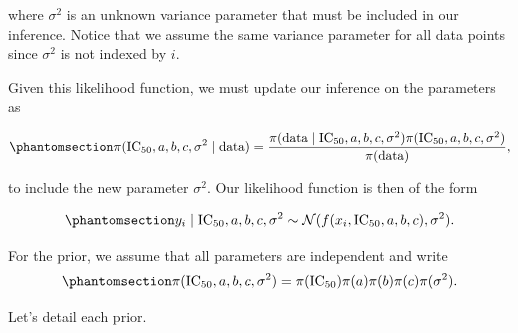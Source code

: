 \documentclass[
]{scrartcl}
\begin{document}
\begin{refsection}
where \(\sigma^2\) is an unknown variance parameter that must be
included in our inference. Notice that we assume the same variance
parameter for all data points since \(\sigma^2\) is not indexed by
\(i\).

Given this likelihood function, we must update our inference on the
parameters as

\begin{equation}\phantomsection\label{eq-bayes-ic50-posterior}{
\pi(\mathrm{IC}_{50}, a, b, c, \sigma^2 \mid \text{data}) = 
\frac{\pi(\text{data} \mid \mathrm{IC}_{50}, a, b, c, \sigma^2) 
\pi(\mathrm{IC}_{50}, a, b, c, \sigma^2)}
{\pi(\text{data})},
}\end{equation}

to include the new parameter \(\sigma^2\). Our likelihood function is
then of the form

\begin{equation}\phantomsection\label{eq-bayes-ic50-likelihood-model}{
y_i \mid \mathrm{IC}_{50}, a, b, c, \sigma^2 \sim 
\mathcal{N}(f(x_i, \mathrm{IC}_{50}, a, b, c), \sigma^2).
}\end{equation}

For the prior, we assume that all parameters are independent and write
\begin{equation}\phantomsection\label{eq-bayes-ic50-prior}{
\pi(\mathrm{IC}_{50}, a, b, c, \sigma^2) = 
\pi(\mathrm{IC}_{50}) \pi(a) \pi(b) \pi(c) \pi(\sigma^2).
}\end{equation}

Let's detail each prior.


\end{refsection}
\end{document}
